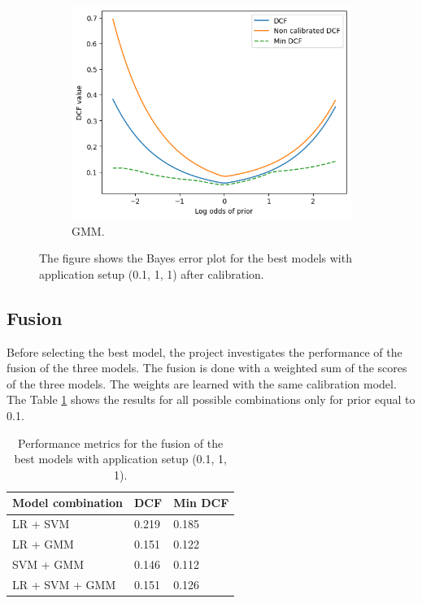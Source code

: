 \documentclass{article}
\begin{document}
\begin{figure}[ht]
\begin{subfigure}[b]{0.3\textwidth}
        \includegraphics[width=\textwidth]{images/calibration_gmm_bayes_error.png}
        \caption{GMM.}
    \end{subfigure}
    \caption{The figure shows the Bayes error plot for the best models with application setup (0.1, 1, 1) after calibration.}
    \label{fig:calibration_weighted}
\end{figure}

\subsection{Fusion}
Before selecting the best model, the project investigates the performance of the fusion of the three models. The fusion is done with a weighted sum of the scores of the three models. The weights are learned with the same calibration model. The Table \ref{tab:fusion} shows the results for all possible combinations only for prior equal to 0.1.

\begin{table}
    \centering
    \begin{tabularx}{\textwidth}{lXX}
        \toprule
        \textbf{Model combination} & \textbf{DCF} & \textbf{Min DCF} \\
        \midrule
        LR + SVM & 0.219 & 0.185 \\
        LR + GMM & 0.151 & 0.122 \\
        SVM + GMM & 0.146 & 0.112 \\
        LR + SVM + GMM & 0.151 & 0.126 \\
        \bottomrule
    \end{tabularx}
    \caption{Performance metrics for the fusion of the best models with application setup (0.1, 1, 1).}
    \label{tab:fusion}
\end{table}
\end{document}
